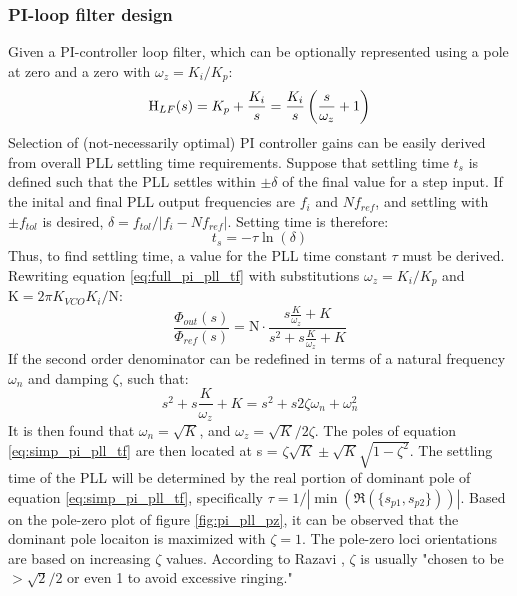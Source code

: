 \subsubsection{PI-loop filter design}
Given a PI-controller loop filter, which can be optionally represented using a pole at zero and a zero with $\omega_z = K_i/K_p$:
\begin{equation} \label{eq:pi_pll_tf}
	\textnormal{H}_{LF}(s) = K_p + \frac{K_i}{s}  = \frac{K_i}{s}\left(\frac{s}{\omega_z} + 1\right) 
\end{equation}
Selection of (not-necessarily optimal) PI controller gains can be easily derived from overall PLL settling time requirements. Suppose that settling time $t_s$ is defined such that the PLL settles within $\pm \delta$ of the final value for a step input. If the inital and final PLL output frequencies are $f_i$ and $Nf_{ref}$, and settling with $\pm f_{tol}$ is desired,  $\delta = f_{tol}/|f_i - Nf_{ref}|$. Setting time is therefore:
\begin{equation}
t_s = -\tau\ln(\delta)
\end{equation}
Thus, to find settling time, a value for the PLL time constant $\tau$ must be derived. Rewriting equation \ref{eq:full_pi_pll_tf} with substitutions $\omega_z = K_i/K_p$ and $\mathrm{K} = 2\pi K_{VCO}K_i/\mathrm{N}$:
\begin{equation} \label{eq:simp_pi_pll_tf}
	\frac{\Phi_{out}(s)}{\Phi_{ref}(s)} = \mathrm{N}\cdot\frac{s\frac{K}{\omega_z} + K }{s^2 + s\frac{K}{\omega_z} + K}
\end{equation}
If the second order denominator can be redefined in terms of a natural frequency $\omega_n$ and damping $\zeta$, such that:
\begin{equation}
	s^2 + s\frac{K}{\omega_z} + K = s^2 + s2\zeta\omega_n + \omega_n^2
\end{equation}
It is then found that $\omega_n = \sqrt{K}$, and $\omega_z = \sqrt{K}/2\zeta$. The poles of equation \ref{eq:simp_pi_pll_tf} are then located at s = $\zeta\sqrt{K} \pm \sqrt{K}\sqrt{1-\zeta^2}$.
The settling time of the PLL will be determined by the real portion of dominant pole of equation \ref{eq:simp_pi_pll_tf}, specifically $\tau = 1/|\min(\Re(\{s_{p1}, s_{p2}\}))|$. Based on the pole-zero plot of figure \ref{fig:pi_pll_pz}, it can be observed that the dominant pole locaiton is maximized with $\zeta=1$. The pole-zero loci orientations are based on increasing $\zeta$ values. According to Razavi \cite{razavi_2017}, $\zeta$ is usually 
"chosen to be $>\sqrt{2}/2$ or even 1 to avoid excessive ringing."
